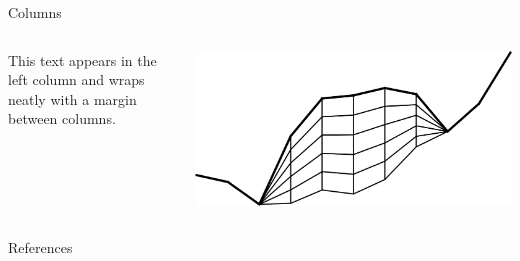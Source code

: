 \documentclass{beamer}
\begin{document}
\begin{frame}{Columns}
	\begin{columns}
			This text appears in the left column and wraps neatly with a margin between columns.
		
			\includegraphics[width=\linewidth]{figs/extruded.png}
	\end{columns}
\end{frame}


\appendix

\begin{frame}{References}
	
	
\end{frame}
\end{document}
